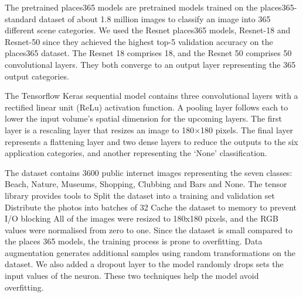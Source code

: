 The pretrained places365 models are 
pretrained models trained on the places365-standard dataset of about
1.8 million images to classify an image into 365
different scene categories. We used the Resnet
places365 models, Resnet-18 and Resnet-50 since they
achieved the highest top-5 validation accuracy on the
places365 dataset. The Resnet 18 comprises 18, and the
Resnet 50 comprises 50 convolutional layers. They both
converge to an output layer representing the 365
output categories.

The Tensorflow Keras sequential model 
contains three convolutional layers with a
rectified linear unit (ReLu) activation function. A
pooling layer follows each to lower the input volume's
spatial dimension for the upcoming layers. The first
layer is a rescaling layer that resizes an image to
180$\times$180 pixels. The final layer represents a
flattening layer and two dense layers to reduce the
outputs to the six application categories, and another
representing the `None' classification.

The dataset contains 3600 public internet images
representing the seven classes: Beach, Nature,
Museums, Shopping, Clubbing and Bars and None. The
tensor library provides tools to Split the dataset
into a training and validation set Distribute the
photos into batches of 32 Cache the dataset to memory
to prevent I/O blocking All of the images were resized
to 180x180 pixels, and the RGB values were normalised
from zero to one.  	Since the dataset is small
compared to the places 365 models, the training
process is prone to overfitting. Data augmentation
generates additional samples using random
transformations on the dataset. We also added
a dropout layer to the model randomly drops sets the
input values of the neuron. These two techniques help
the model avoid overfitting.



